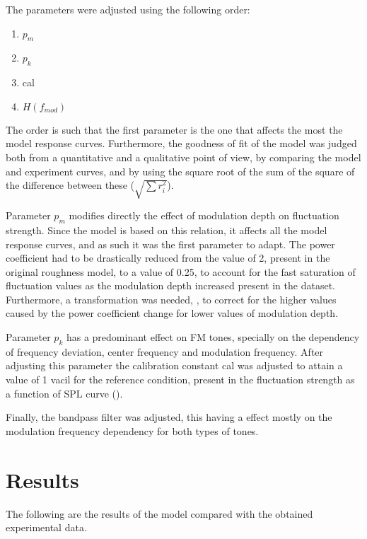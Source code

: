\documentclass[../main.tex]{subfiles}
\begin{document}
\begin{modelchapter}
The parameters were adjusted using the following order:
\begin{enumerate}
  \item $p_m$
  \item $p_k$
  \item cal
  \item $H(f_{mod})$
\end{enumerate}

The order is such that the first parameter is the one that affects the most the
model response curves. Furthermore, the goodness of fit of the model was judged
both from a quantitative and a qualitative point of view, by comparing the model
and experiment curves, and by using the square root of the sum of the square of
the difference between these ($\sqrt{\sum r_i^2}$).

Parameter $p_m$ modifies directly the effect of modulation depth on fluctuation
strength. Since the model is based on this relation, it affects all the model
response curves, and as such it was the first parameter to adapt. The power
coefficient had to be drastically reduced from the value of 2, present in the
original roughness model, to a value of 0.25, to account for the fast saturation
of fluctuation values as the modulation depth increased present in the dataset.
Furthermore, a transformation was needed,
, to correct for the higher
values caused by the power coefficient change for lower values of
modulation depth.

Parameter $p_k$ has a predominant effect on \gls{FM} tones, specially on the
dependency of frequency deviation, center frequency and modulation frequency.
After adjusting this parameter the calibration constant cal was adjusted to
attain a value of 1 vacil for the reference condition, present in the
fluctuation strength as a function of \gls{SPL} curve
().

Finally, the bandpass filter was adjusted, this having a effect mostly on the
modulation frequency dependency for both types of tones.

\section{Results}

The following are the results of the model compared with the obtained
experimental data.



\end{modelchapter}
\end{document}
